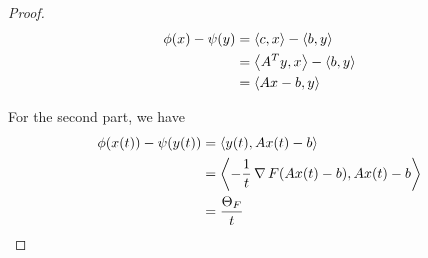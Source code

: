 \begin{proof}
  \begin{align}
    \label{eq:86}
    \phi(x) - \psi(y) &= \IP{c, x} - \IP{b, y} \\
    &= \IP{A^{T} y, x} - \IP{b, y} \\
    &= \IP{Ax - b, y}
  \end{align}

  For the second part, we have
  \begin{align}
    \label{eq:87}
    \phi(x(t)) - \psi(y(t)) &= \IP{y(t), Ax(t) - b} \\
    &= \IP{-\frac{1}{t} \grad F(Ax(t) - b), Ax(t) - b} \\
    &= \frac{\Theta_{F}}{t}
  \end{align}
\end{proof}


